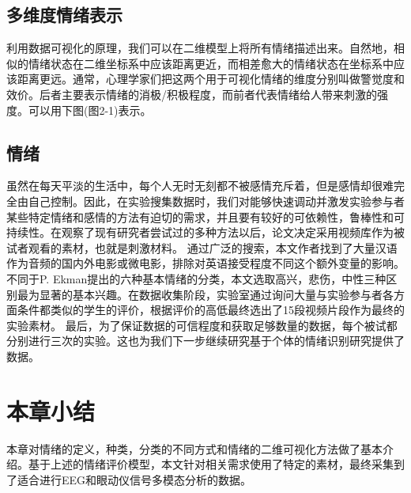 	 \subsection{多维度情绪表示}
	 利用数据可视化的原理，我们可以在二维模型上将所有情绪描述出来。自然地，相似的情绪状态在二维坐标系中应该距离更近，而相差愈大的情绪状态在坐标系中应该距离更远。通常，心理学家们把这两个用于可视化情绪的维度分别叫做警觉度和效价。后者主要表示情绪的消极/积极程度，而前者代表情绪给人带来刺激的强度。可以用下图(图2-1)表示。
	 \subsection{情绪}
	 虽然在每天平淡的生活中，每个人无时无刻都不被感情充斥着，但是感情却很难完全由自己控制。因此，在实验搜集数据时，我们对能够快速调动并激发实验参与者某些特定情绪和感情的方法有迫切的需求，并且要有较好的可依赖性，鲁棒性和可持续性。在观察了现有研究者尝试过的多种方法以后，论文决定采用视频库作为被试者观看的素材，也就是刺激材料。
	 通过广泛的搜索，本文作者找到了大量汉语作为音频的国内外电影或微电影，排除对英语接受程度不同这个额外变量的影响。不同于P. Ekman提出的六种基本情绪的分类，本文选取高兴，悲伤，中性三种区别最为显著的基本兴趣。在数据收集阶段，实验室通过询问大量与实验参与者各方面条件都类似的学生的评价，根据评价的高低最终选出了15段视频片段作为最终的实验素材。
	 最后，为了保证数据的可信程度和获取足够数量的数据，每个被试都分别进行三次的实验。这也为我们下一步继续研究基于个体的情绪识别研究提供了数据。
\section{本章小结}
	本章对情绪的定义，种类，分类的不同方式和情绪的二维可视化方法做了基本介绍。基于上述的情绪评价模型，本文针对相关需求使用了特定的素材，最终采集到了适合进行EEG和眼动仪信号多模态分析的数据。

